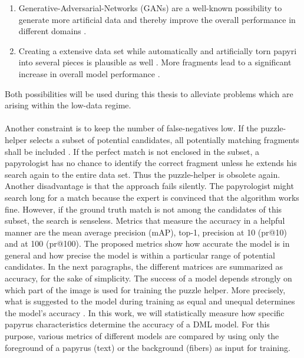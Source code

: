 \documentclass[12pt,a4paper]{article}
\begin{document}
\begin{enumerate}
	\item Generative-Adversarial-Networks \cite{Goodfellow14} (GANs) are a well-known possibility to generate more artificial data and thereby improve the overall performance in different domains \cite{Tamrin21}.
	\item Creating a extensive data set while automatically and artificially torn papyri into several pieces is plausible as well \cite{Seuret21}. More fragments lead to a significant increase in overall model performance \cite{Pirrone21, Ostertag21}.  
\end{enumerate}

Both possibilities will be used during this thesis to alleviate problems which are arising within the low-data regime. 
\\\\
Another constraint is to keep the number of false-negatives low. If the puzzle-helper selects a subset of potential candidates, all potentially matching fragments shall be included . If the perfect match is not enclosed in the subset, a papyrologist has no chance to identify the correct fragment unless he extends his search again to the entire data set. Thus the puzzle-helper is obsolete again. Another disadvantage is that the approach fails silently. The papyrologist might search long for a match because the expert is convinced that the algorithm works fine. However, if the ground truth match is not among the candidates of this subset, the search is senseless. Metrics that measure the accuracy in a helpful manner are the mean average precision (mAP), top-1, precision at 10 (pr@10) and at 100 (pr@100).
The proposed metrics show how accurate the model is in general and how precise the model is within a particular range of potential candidates. In the next paragraphs, the different matrices are summarized as accuracy, for the sake of simplicity. The success of a model depends strongly on which part of the image is used for training the puzzle helper. More precisely, what is suggested to the model during training as equal and unequal determines the model's accuracy \cite{Pirrone21}. In this work, we will statistically measure how specific papyrus characteristics determine the accuracy of a DML model. For this purpose, various metrics of different models are compared by using only the foreground of a papyrus (text) or the background (fibers) as input for training. 
\end{document}
